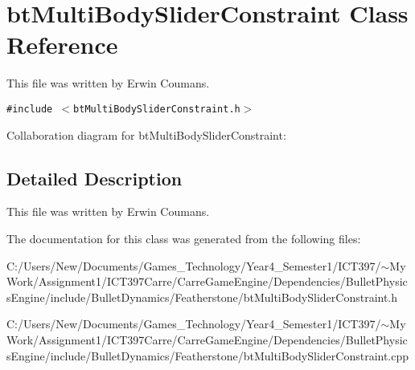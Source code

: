 \hypertarget{classbt_multi_body_slider_constraint}{
\section{btMultiBodySliderConstraint Class Reference}
\label{classbt_multi_body_slider_constraint}
}
This file was written by Erwin Coumans.  


{\tt \#include $<$btMultiBodySliderConstraint.h$>$}

Collaboration diagram for btMultiBodySliderConstraint:

\subsection{Detailed Description}
This file was written by Erwin Coumans. 

The documentation for this class was generated from the following files:\begin{CompactItemize}
\item 
C:/Users/New/Documents/Games\_\-Technology/Year4\_\-Semester1/ICT397/$\sim$My Work/Assignment1/ICT397Carre/CarreGameEngine/Dependencies/BulletPhysicsEngine/include/BulletDynamics/Featherstone/btMultiBodySliderConstraint.h\item 
C:/Users/New/Documents/Games\_\-Technology/Year4\_\-Semester1/ICT397/$\sim$My Work/Assignment1/ICT397Carre/CarreGameEngine/Dependencies/BulletPhysicsEngine/include/BulletDynamics/Featherstone/btMultiBodySliderConstraint.cpp\end{CompactItemize}
